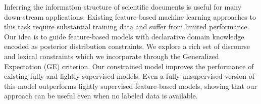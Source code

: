Inferring the information structure of scientific documents is useful for many down-stream applications. Existing feature-based machine learning approaches to
 this task require substantial training data and suffer from limited
 performance. Our idea is to guide feature-based models with declarative domain
 knowledge encoded as posterior distribution constraints. We explore a rich set
 of discourse and lexical  constraints which we incorporate through the
 Generalized Expectation (GE) criterion. Our constrained model improves the
 performance of existing fully and lightly supervised models. Even a fully
 unsupervised version of this model outperforms lightly supervised feature-based
 models, showing that our approach can be useful even when no labeled data is
 available.

